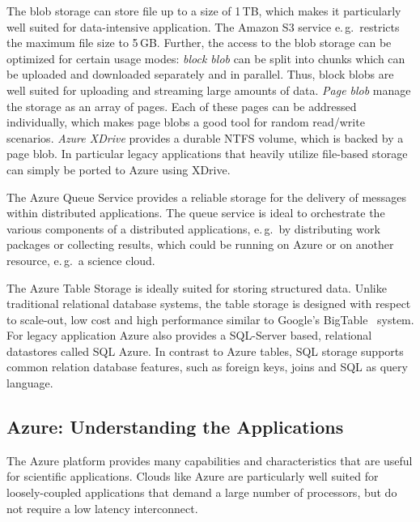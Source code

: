 \documentclass[graybox]{svmult}
\begin{document}
The blob storage can store file up to a size of 1\,TB, which makes it
particularly well suited for data-intensive application. The Amazon S3
service e.\,g.\ restricts the maximum file size to 5\,GB. Further, the
access to the blob storage can be optimized for certain usage modes:
\emph{block blob} can be split into chunks which can be uploaded and
downloaded separately and in parallel.  Thus, block blobs are well
suited for uploading and streaming large amounts of data. \emph{Page
  blob} manage the storage as an array of pages. Each of these pages
can be addressed individually, which makes page blobs a good tool for
random read/write scenarios. \emph{Azure XDrive} provides a durable
NTFS volume, which is backed by a page blob. In particular legacy
applications that heavily utilize file-based storage can simply be
ported to Azure using XDrive.

The Azure Queue Service provides a reliable storage for the delivery
of messages within distributed applications.  The queue service is
ideal to orchestrate the various components of a distributed
applications, e.\,g.\ by distributing work packages or collecting
results, which could be running on Azure or on another resource,
e.\,g.\ a science cloud.

The Azure Table Storage is ideally suited for storing structured
data. Unlike traditional relational database systems, the table
storage is designed with respect to scale-out, low cost and high
performance similar to Google's BigTable~\cite{bigtable2006}
system. For legacy application Azure also provides a SQL-Server based,
relational datastores called SQL Azure. In contrast to Azure tables,
SQL storage supports common relation database features, such as
foreign keys, joins and SQL as query language.


\subsection{Azure: Understanding the Applications}

The Azure platform provides many capabilities and characteristics that
are useful for scientific applications. Clouds like Azure are
particularly well suited for loosely-coupled applications that demand
a large number of processors, but do not require a low latency
interconnect. 
\end{document}

